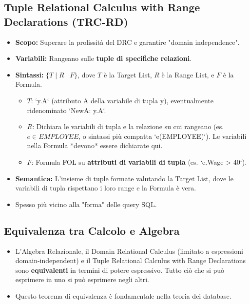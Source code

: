\documentclass{article}
\begin{document}
	\subsection{Tuple Relational Calculus with Range Declarations (TRC-RD)}
	\begin{itemize}
		\item \textbf{Scopo:} Superare la prolissità del DRC e garantire "domain independence".
		\item \textbf{Variabili:} Rangeano sulle \textbf{tuple di specifiche relazioni}.
		\item \textbf{Sintassi:} $\{ T \mid R \mid F \}$, dove $T$ è la Target List, $R$ è la Range List, e $F$ è la Formula.
		\begin{itemize}
			\item $T$: `y.A` (attributo A della variabile di tupla y), eventualmente ridenominato `NewA: y.A`.
			\item $R$: Dichiara le variabili di tupla e la relazione su cui rangeano (es. $e \in EMPLOYEE$, o sintassi più compatta `e(EMPLOYEE)`). Le variabili nella Formula *devono* essere dichiarate qui.
			\item $F$: Formula FOL su \textbf{attributi di variabili di tupla} (es. `e.Wage > 40`).
		\end{itemize}
		\item \textbf{Semantica:} L'insieme di tuple formate valutando la Target List, dove le variabili di tupla rispettano i loro range e la Formula è vera.
		\item Spesso più vicino alla "forma" delle query SQL.
	\end{itemize}
	
	\subsection{Equivalenza tra Calcolo e Algebra}
	\begin{itemize}
		\item L'Algebra Relazionale, il Domain Relational Calculus (limitato a espressioni domain-independent) e il Tuple Relational Calculus with Range Declarations sono \textbf{equivalenti} in termini di potere espressivo. Tutto ciò che si può esprimere in uno si può esprimere negli altri.
		\item Questo teorema di equivalenza è fondamentale nella teoria dei database.
	\end{itemize}
	
\end{document}
